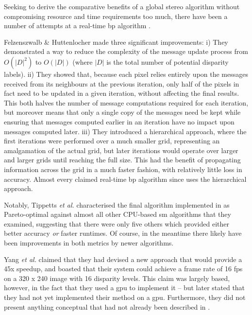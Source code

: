 Seeking to derive the comparative benefits of a global stereo algorithm without compromising resource and time requirements too much, there have been a number of attempts at a real-time \gls{bp} algorithm \cite{Liang2011,Perez2010}.

Felzenszwalb \& Huttenlocher \cite{Felzenszwalb2006} made three significant improvements:  i) They demonstrated a way to reduce the complexity of the message update process from \(O(|D|^2)\) to \(O(|D|)\) (where \(|D|\) is the total number of potential disparity labels).  ii) They showed that, because each pixel relies entirely upon the messages received from its neighbours at the previous iteration, only half of the pixels in fact need to be updated in a given iteration, without affecting the final results.  This both halves the number of message computations required for each iteration, but moreover means that only a single copy of the messages need be kept while ensuring that messages computed earlier in an iteration have no impact upon messages computed later.  iii)  They introduced a hierarchical approach, where the first iterations were performed over a much smaller grid, representing an amalgamation of the actual grid, but later iterations would operate over larger and larger grids until reaching the full size.  This had the benefit of propagating information across the grid in a much faster fashion, with relatively little loss in accuracy.  Almost every claimed real-time \gls{bp} algorithm since uses the hierarchical approach.

Notably, Tippetts \textit{et al.} characterised the final algorithm implemented in \cite{Felzenszwalb2006} as Pareto-optimal against almost all other CPU-based \gls{sm} algorithms that they examined, suggesting that there were only five others which provided either better accuracy \emph{or} faster runtimes.  Of course, in the meantime there likely have been improvements in both metrics by newer algorithms.

Yang \textit{et al.} \cite{Yang2006} claimed that they had devised a new approach that would provide a 45x speedup, and boasted that their system could achieve a frame rate of 16 \gls{fps} on a 320 x 240 image with 16 disparity levels.  This claim was largely based, however, in the fact that they used a \gls{gpu} to implement it -- but later stated that they had not yet implemented their method on a \gls{gpu}.  Furthermore, they did not present anything conceptual that had not already been described in \cite{Felzenszwalb2006}. %

